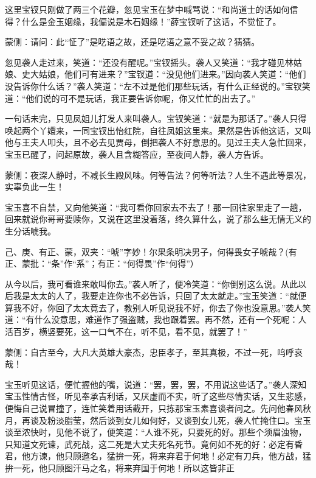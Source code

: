 \begin{parag}
    这里宝钗只刚做了两三个花瓣，忽见宝玉在梦中喊骂说：“和尚道士的话如何信得？什么是金玉姻缘，我偏说是木石姻缘！”薛宝钗听了这话，不觉怔了。\begin{note}蒙侧：请问：此“怔了”是呓语之故，还是呓语之意不妥之故？猜猜。\end{note}忽见袭人走过来，笑道：“还没有醒呢。”宝钗摇头。袭人又笑道：“我才碰见林姑娘、史大姑娘，他们可有进来？”宝钗道：“没见他们进来。”因向袭人笑道：“他们没告诉你什么话？”袭人笑道：“左不过是他们那些玩话，有什么正经说的。”宝钗笑道：“他们说的可不是玩话，我正要告诉你呢，你又忙忙的出去了。”
\end{parag}


\begin{parag}
    一句话未完，只见凤姐儿打发人来叫袭人。宝钗笑道：“就是为那话了。”袭人只得唤起两个丫嬛来，一同宝钗出怡红院，自往凤姐这里来。果然是告诉他这话，又叫他与王夫人叩头，且不必去见贾母，倒把袭人不好意思的。见过王夫人急忙回来，宝玉已醒了，问起原故，袭人且含糊答应，至夜间人静，袭人方告诉。\begin{note}蒙侧：夜深人静时，不减长生殿风味。何等告法？何等听法？人生不遇此等景况，实辜负此一生！\end{note}宝玉喜不自禁，又向他笑道：“我可看你回家去不去了！那一回往家里走了一趟，回来就说你哥哥要赎你，又说在这里没着落，终久算什么，说了那么些无情无义的生分话唬我。\begin{note}己、庚、有正、蒙，双夹：“唬”字妙！尔果条明决男子，何得畏女子唬哉？(有正、蒙批：“条”作“系”；有正：“何得畏”作“何得”）\end{note}从今以后，我可看谁来敢叫你去。”袭人听了，便冷笑道：“你倒别这么说。从此以后我是太太的人了，我要走连你也不必告诉，只回了太太就走。”宝玉笑道：“就便算我不好，你回了太太竟去了，教别人听见说我不好，你去了你也没意思。”袭人笑道：“有什么没意思，难道作了强盗贼，我也跟着罢。再不然，还有一个死呢：人活百岁，横竖要死，这一口气不在，听不见，看不见，就罢了！”\begin{note}蒙侧：自古至今，大凡大英雄大豪杰，忠臣孝子，至其真极，不过一死，呜呼哀哉！\end{note}宝玉听见这话，便忙握他的嘴，说道：“罢，罢，罢，不用说这些话了。”袭人深知宝玉性情古怪，听见奉承吉利话，又厌虚而不实，听了这些尽情实话，又生悲感，便悔自己说冒撞了，连忙笑着用话截开，只拣那宝玉素喜谈者问之。先问他春风秋月，再谈及粉淡脂莹，然后谈到女儿如何好，又谈到女儿死，袭人忙掩住口。宝玉谈至浓快时，见他不说了，便笑道：“人谁不死，只要死的好。那些个须眉浊物，只知道文死谏，武死战，这二死是大丈夫死名死节。竟何如不死的好：必定有昏君，他方谏，他只顾邀名，猛拚一死，将来弃君于何地！必定有刀兵，他方战，猛拚一死，他只顾图汗马之名，将来弃国于何地！所以这皆非正
\end{parag}
